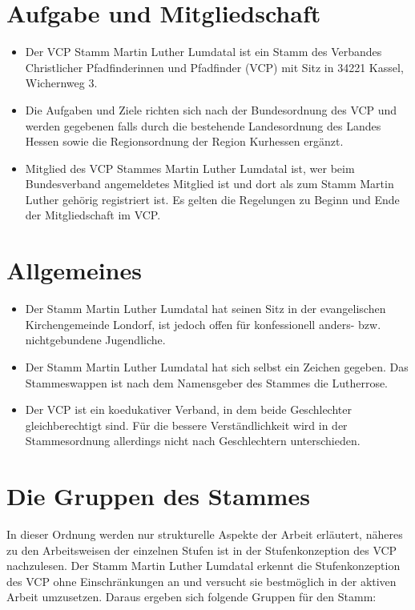 \documentclass[a4paper]{article}
\begin{document}
\clearpage
\tableofcontents 
\clearpage

\section{Aufgabe und Mitgliedschaft} %
\label{sec:aufgabe_und_mitgliedschaft}
	\begin{itemize}
		\item Der VCP Stamm Martin Luther Lumdatal ist ein Stamm des Verbandes Christlicher Pfadfinderinnen und Pfadfinder (VCP) mit Sitz in 34221 Kassel, Wichernweg 3. 
		\item Die Aufgaben und Ziele richten sich nach der Bundesordnung des VCP und werden gegebenen falls durch die bestehende Landesordnung des Landes Hessen sowie die Regionsordnung der Region Kurhessen ergänzt. 
		\item Mitglied des VCP Stammes Martin Luther Lumdatal ist, wer beim Bundesverband angemeldetes Mitglied ist und dort als zum Stamm Martin Luther gehörig registriert ist. Es gelten die Regelungen zu Beginn und Ende der Mitgliedschaft im VCP. 
	\end{itemize}

\section{Allgemeines} %
\label{sec:allgemeines}
	\begin{itemize}
		\item Der Stamm Martin Luther Lumdatal hat seinen Sitz in der evangelischen Kirchengemeinde Londorf, ist jedoch offen für konfessionell anders- bzw. nichtgebundene Jugendliche. 
		\item Der Stamm Martin Luther Lumdatal hat sich selbst ein Zeichen gegeben. Das Stammeswappen ist nach dem Namensgeber des Stammes die Lutherrose. 
		\item Der VCP ist ein koedukativer Verband, in dem beide Geschlechter gleichberechtigt sind. Für die bessere Verständlichkeit wird in der Stammesordnung allerdings nicht nach Geschlechtern unterschieden.
	\end{itemize}

\section{Die Gruppen des Stammes} %
\label{sec:die_gruppen_des_stammes}
In dieser Ordnung werden nur strukturelle Aspekte der Arbeit erläutert, näheres zu den Arbeitsweisen der einzelnen Stufen ist in der Stufenkonzeption des VCP nachzulesen. Der Stamm Martin Luther Lumdatal erkennt die Stufenkonzeption des VCP ohne Einschränkungen an und versucht sie bestmöglich in der aktiven Arbeit umzusetzen. Daraus ergeben sich folgende Gruppen für den Stamm:
\end{document}
